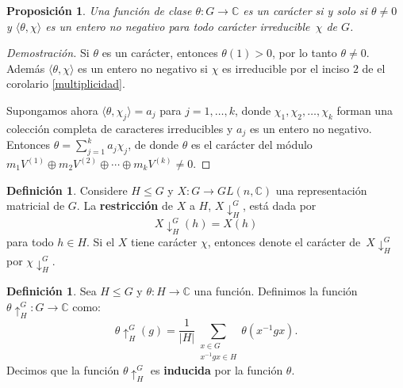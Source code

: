 \documentclass[12pt]{book}
\newtheorem{proposition}[theorem]{Proposición}
\theoremstyle{definition}
\newtheorem{definition}[theorem]{Definición}
\newcounter{in}
\newcounter{ini}
\begin{document}
\begin{proposition}
\label{fun-cla-caracter}
Una función de clase $\theta:G\rightarrow\mathbb{C}$ es un carácter si
y solo si $\theta\neq 0$ y $\langle\theta,\chi\rangle$ es un entero no
negativo para todo carácter irreducible~$\chi$ de $G$. 
\end{proposition}
\begin{proof}[Demostración]
Si $\theta$ es un carácter, entonces $\theta(1)>0$, por lo tanto
$\theta\neq 0$. Además $\langle\theta,\chi\rangle$ es un entero no
negativo si $\chi$ es irreducible por el inciso $2$ de el corolario
\ref{multiplicidad}.

Supongamos ahora $\langle\theta,\chi_{j}\rangle=a_{j}$ para
$j=1,\ldots,k$, donde $\chi_{1},\chi_{2},\ldots,\chi_{k}$ forman una
colección completa de caracteres irreducibles y $a_{j}$ es un entero
no negativo. Entonces $\theta=\sum^{k}_{j=1}a_{j}\chi_{j}$, de donde
$\theta$ es el carácter del módulo $m_{1}V^{(1)}\oplus
m_{2}V^{(2)}\oplus\cdots\oplus m_{k}V^{(k)}\neq 0$. 
\end{proof}

\begin{definition}
  Considere $H\leq G$ y $X:G\rightarrow GL(n,\mathbb{C})$ una
  representación matricial de $G$. La \textbf{restricción} de $X$ a
  $H$, $X\downarrow^{G}_{H}$, está dada por
  \begin{equation*}
    X\downarrow^{G}_{H}(h)=X(h)
  \end{equation*}
  para todo $h\in H$. Si el $X$ tiene carácter $\chi$, entonces denote
  el carácter de~$X\downarrow^{G}_{H}$ por $\chi\downarrow^{G}_{H}$.
\end{definition}

\begin{definition}
  Sea $H\leq G$ y $\theta:H\rightarrow \mathbb{C}$ una función. Definimos la
  función $\theta\uparrow^{G}_{H}:G\rightarrow \mathbb{C}$ como:
  \begin{equation*}
    \theta\uparrow^{G}_{H}(g)=\frac{1}{|H|}\sum_{\substack{x\in
        G\\x^{-1}gx\in H}}\theta(x^{-1}gx).
  \end{equation*}
  Decimos que la función $\theta\uparrow^{G}_{H}$ es \textbf{inducida}
  por la función $\theta$.
\end{definition}
\end{document}
